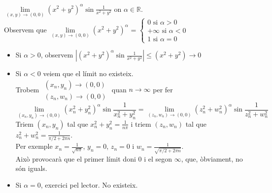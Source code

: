 \documentclass[../main.tex]{subfiles}
\begin{document}
    \begin{exemple}
        $\lim\limits_{\left( x,y \right) \rightarrow \left( 0, 0 \right)}(x^2+y^2)^\alpha \sin{\frac{1}{x^2+y^2}}$ on $\alpha \in \mathbb{R}$.
        \\Observem que $\lim\limits_{\left( x,y \right) \rightarrow \left( 0, 0 \right)}(x^2+y^2)^\alpha$ = $\begin{cases}
            0 \text{ si } \alpha > 0\\
            +\infty \text{ si } \alpha < 0\\
            1 \text{ si } \alpha = 0
        \end{cases}$
        \begin{itemize}
            \item Si $\alpha > 0$, observem $|(x^2+y^2)^\alpha \sin{\frac{1}{x^2+y^2}}| \leq (x^2+y^2) \longrightarrow 0$
            \item Si $\alpha < 0$  veiem que el límit no existeix.\\
            Trobem $\substack{\left( x_n, y_n \right) \rightarrow \left( 0, 0 \right)\\\left( z_n, w_n \right) \rightarrow \left( 0, 0 \right)}$ quan $n \rightarrow \infty$ per fer \begin{displaymath}
                \lim\limits_{\left( x_n,y_n \right) \rightarrow \left( 0, 0 \right)}(x_n^2+y_n^2)^\alpha \sin{\frac{1}{x_n^2+y_n^2}} = \lim\limits_{\left( z_n,w_n \right) \rightarrow \left( 0, 0 \right)}(z_n^2+w_n^2)^\alpha \sin{\frac{1}{z_n^2+w_n^2}}
            \end{displaymath}       
            Triem $\left( x_n, y_n \right)$ tal que $x_n^2 + y_n^2 = \frac{1}{n\pi}$ i triem $\left( z_n, w_n \right)$ tal que $z_n^2+w_n^2 = \frac{1}{\pi/2 + 2\pi n}$.\\
            Per exemple $x_n = \frac{1}{\sqrt{n\pi}}$, $y_n = 0$, $z_n = 0$ i $w_n = \frac{1}{\sqrt{\pi/2+2\pi n}}$.\\
            Això provocarà que el primer límit doni $0$ i el segon $\infty$, que, òbviament, no són
            iguals.
            \item Si $\alpha = 0$, exercici pel lector. No existeix.
        \end{itemize}
    \end{exemple}
\end{document}

